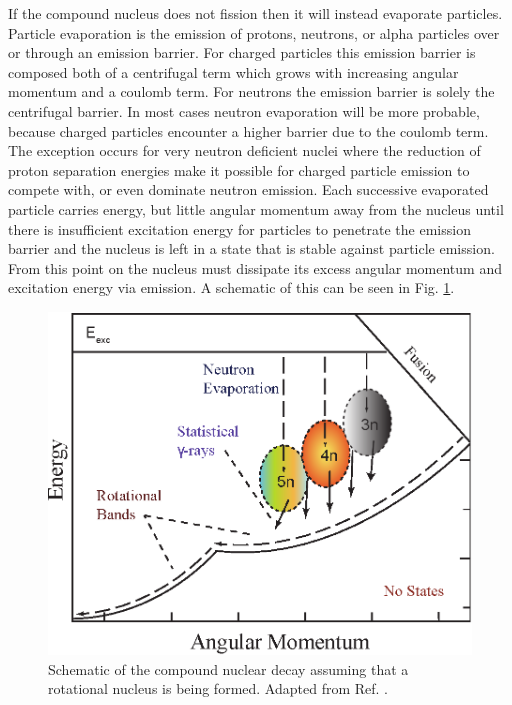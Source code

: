 If the compound nucleus does not fission then it will instead evaporate particles. Particle evaporation is the emission of protons, neutrons, or alpha particles over or through an emission barrier. For charged particles this emission barrier is composed both of a centrifugal term which grows with increasing angular momentum and a coulomb term. For neutrons the emission barrier is solely the centrifugal barrier. In most cases neutron evaporation will be more probable, because charged particles encounter a higher barrier due to the coulomb term. The exception occurs for very neutron deficient nuclei where the reduction of proton separation energies make it possible for charged particle emission to compete with, or even dominate neutron emission. Each successive evaporated particle carries energy, but little angular momentum away from the nucleus until there is insufficient excitation energy for particles to penetrate the emission barrier and the nucleus is left in a state that is stable against particle emission. From this point on the nucleus must dissipate its excess angular momentum and excitation energy via \gr{} emission. A schematic of this can be seen in Fig. \ref{fig:chp3-emission-schematic}.

\begin{figure}[h!]
	\centerline{\includegraphics[height=0.3\textheight]{./img/c3/evaporation_chans.eps}}
	\caption{Schematic of the compound nuclear decay assuming that a rotational nucleus is being formed. Adapted from Ref. \cite{danielDissertation}.}
	\label{fig:chp3-emission-schematic}
\end{figure}

